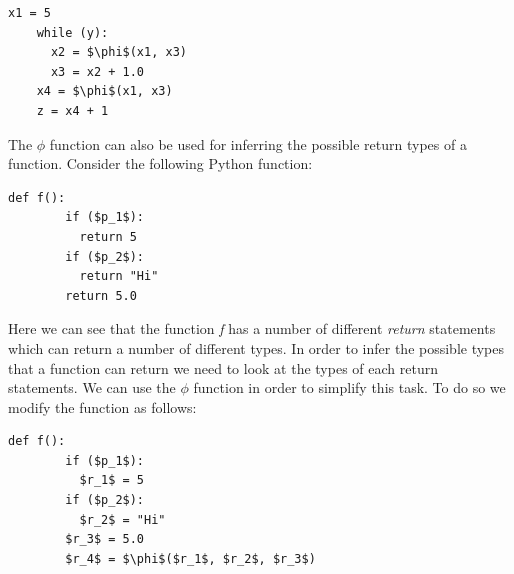 \documentclass[12pt, titlepage]{article}
\begin{document}
\begin{lstlisting}[mathescape]
    x1 = 5
    while (y):
      x2 = $\phi$(x1, x3)
      x3 = x2 + 1.0
    x4 = $\phi$(x1, x3)
    z = x4 + 1
\end{lstlisting}
The $\phi$ function can also be used for inferring the possible return types of a function. Consider the following Python function:
\begin{lstlisting}[mathescape]
    def f():
        if ($p_1$):
          return 5
        if ($p_2$):
          return "Hi"
        return 5.0
\end{lstlisting}
Here we can see that the function \textit{f} has a number of different \textit{return} statements which can return a number of different types. In order to infer the possible types that a function can return we need to look at the types of each return statements. We can use the $\phi$ function in order to simplify this task. To do so we modify the function as follows:
\begin{lstlisting}[mathescape]
    def f():
        if ($p_1$):
          $r_1$ = 5
        if ($p_2$):
          $r_2$ = "Hi"
        $r_3$ = 5.0
        $r_4$ = $\phi$($r_1$, $r_2$, $r_3$)
\end{lstlisting}
\end{document}
